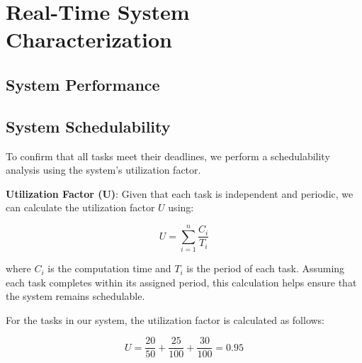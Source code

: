 \documentclass[a4paper,12pt]{article}
\begin{document}
\section{Real-Time System Characterization}
\subsection{System Performance}

\subsection{System Schedulability}
To confirm that all tasks meet their deadlines, we perform a schedulability analysis using the system's utilization factor.

\textbf{Utilization Factor (U)}: Given that each task is independent and periodic, we can calculate the utilization factor \( U \) using:

\[
U = \sum_{i=1}^n \frac{C_i}{T_i}
\]

where \( C_i \) is the computation time and \( T_i \) is the period of each task. Assuming each task completes within its assigned period, this calculation helps ensure that the system remains schedulable.

For the tasks in our system, the utilization factor is calculated as follows:

\[
U = \frac{20}{50} + \frac{25}{100} + \frac{30}{100} = 0.95 
\]

\end{document}
